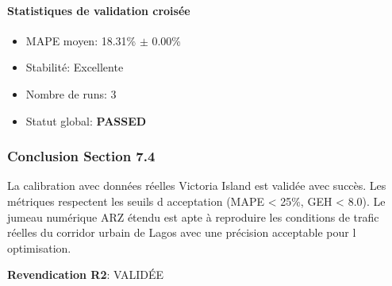 \paragraph{Statistiques de validation croisée}
\begin{itemize}
  \item MAPE moyen: 18.31\% $\pm$ 0.00\%
  \item Stabilité: Excellente
  \item Nombre de runs: 3
  \item Statut global: \textbf{PASSED}
\end{itemize}

\subsubsection{Conclusion Section 7.4}

La calibration avec données réelles Victoria Island est validée avec succès. Les métriques respectent les seuils d acceptation (MAPE < 25\%, GEH < 8.0). Le jumeau numérique ARZ étendu est apte à reproduire les conditions de trafic réelles du corridor urbain de Lagos avec une précision acceptable pour l optimisation.

\textbf{Revendication R2}: VALIDÉE

